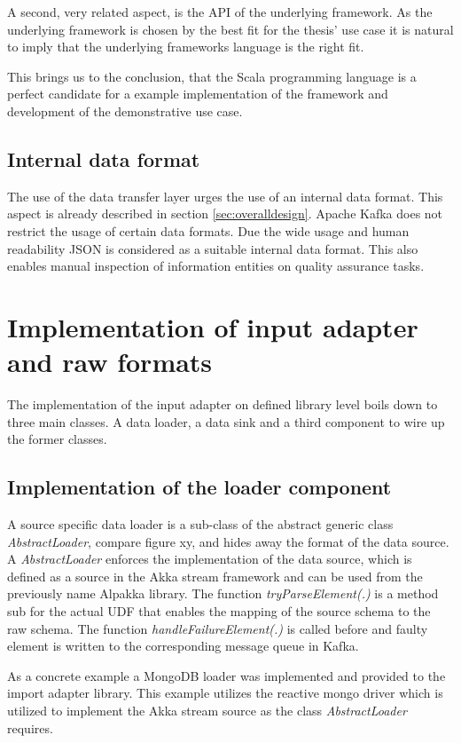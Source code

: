 A second, very related aspect, is the API of the underlying framework. As the underlying framework is chosen by the best fit for the thesis' use case it is natural to imply that the underlying frameworks language is the right fit. 

This brings us to the conclusion, that the Scala programming language is a perfect candidate for a example implementation of the framework and development of the demonstrative use case.

\subsection{Internal data format}
The use of the data transfer layer urges the use of an internal data format. This aspect is already described in section \ref{sec:overalldesign}. Apache Kafka does not restrict the usage of certain data formats. Due the wide usage and human readability JSON is considered as a suitable internal data format. This also enables manual inspection of information entities on quality assurance tasks. 

\section{Implementation of input adapter and raw formats}

The implementation of the input adapter on defined library level boils down to three main classes. A data loader, a data sink and a third component to wire up the former classes. 

\subsection{Implementation of the loader component \label{ssec:loadercomponent}}

A source specific data loader is a sub-class of the abstract generic class \textit{AbstractLoader}, compare figure xy, and hides away the format of the data source. A \textit{AbstractLoader} enforces the implementation of the data source, which is defined as a source in the Akka stream framework and can be used from the previously name Alpakka library. The function \textit{tryParseElement(.)} is a method sub for the actual UDF that enables the mapping of the source schema to the raw schema. The function \textit{handleFailureElement(.)} is called before and faulty element is written to the corresponding message queue in Kafka.

As a concrete example a MongoDB loader was implemented and provided to the import adapter library. This example utilizes the reactive mongo driver which is utilized to implement the Akka stream source as the class \textit{AbstractLoader} requires.

